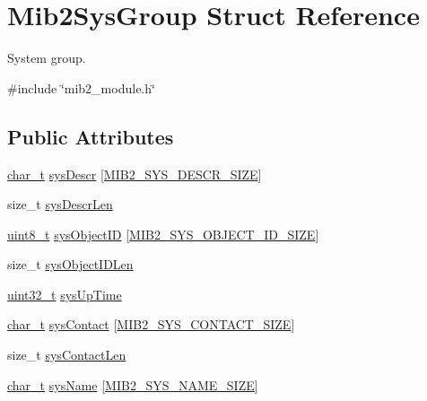 \hypertarget{structMib2SysGroup}{}\section{Mib2\+Sys\+Group Struct Reference}
\label{structMib2SysGroup}


System group.  




{\ttfamily \#include \char`\"{}mib2\+\_\+module.\+h\char`\"{}}

\subsection*{Public Attributes}
\begin{DoxyCompactItemize}
\item 
\hyperlink{compiler__port_8h_a40bb5262bf908c328fbcfbe5d29d0201}{char\+\_\+t} \hyperlink{structMib2SysGroup_aad04da4f826e381e4ab19101a5e4b421}{sys\+Descr} \mbox{[}\hyperlink{mib2__module_8h_a3f91e2e53ad64eb89d3bbbd4861e4d1e}{M\+I\+B2\+\_\+\+S\+Y\+S\+\_\+\+D\+E\+S\+C\+R\+\_\+\+S\+I\+ZE}\mbox{]}
\item 
size\+\_\+t \hyperlink{structMib2SysGroup_a0fcf9584e1b90260ca11d99b062d7b22}{sys\+Descr\+Len}
\item 
\hyperlink{stdint_8h_aba7bc1797add20fe3efdf37ced1182c5}{uint8\+\_\+t} \hyperlink{structMib2SysGroup_aa6db75ff8f5ca64afeb396ec9ecdc06a}{sys\+Object\+ID} \mbox{[}\hyperlink{mib2__module_8h_ad2e57875dbc8bd329c10dc6516506292}{M\+I\+B2\+\_\+\+S\+Y\+S\+\_\+\+O\+B\+J\+E\+C\+T\+\_\+\+I\+D\+\_\+\+S\+I\+ZE}\mbox{]}
\item 
size\+\_\+t \hyperlink{structMib2SysGroup_a63e95d72c5b675f304680e3f0706401a}{sys\+Object\+I\+D\+Len}
\item 
\hyperlink{stdint_8h_a435d1572bf3f880d55459d9805097f62}{uint32\+\_\+t} \hyperlink{structMib2SysGroup_a6070d9b761f1ad532fa76fb8095a4256}{sys\+Up\+Time}
\item 
\hyperlink{compiler__port_8h_a40bb5262bf908c328fbcfbe5d29d0201}{char\+\_\+t} \hyperlink{structMib2SysGroup_a22d651637f98280f2d6e4e40d29d0dd1}{sys\+Contact} \mbox{[}\hyperlink{mib2__module_8h_abb92174837e66407111b11db4825cc70}{M\+I\+B2\+\_\+\+S\+Y\+S\+\_\+\+C\+O\+N\+T\+A\+C\+T\+\_\+\+S\+I\+ZE}\mbox{]}
\item 
size\+\_\+t \hyperlink{structMib2SysGroup_a69aa565a6eabca9e8c3bab2120d94eba}{sys\+Contact\+Len}
\item 
\hyperlink{compiler__port_8h_a40bb5262bf908c328fbcfbe5d29d0201}{char\+\_\+t} \hyperlink{structMib2SysGroup_a5b0d6c49d88571d72deefa5313ed4f56}{sys\+Name} \mbox{[}\hyperlink{mib2__module_8h_af4f01af44a1ff468bc177841a80c0c64}{M\+I\+B2\+\_\+\+S\+Y\+S\+\_\+\+N\+A\+M\+E\+\_\+\+S\+I\+ZE}\mbox{]}

\end{DoxyCompactItemize}
